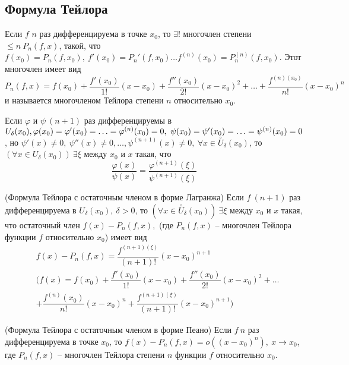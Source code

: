 \begin{multicols}{2}
    \subsection*{Формула Тейлора}
    \begin{lemma}{}{}
        Если $f$ $n$ раз дифференцируема в точке $x_0$, то $\exists !$ многочлен степени $\leq n\ P_n(f,x)$, такой, что $f(x_0) = P_n(f,x_0),\ f'(x_0) = P_n'(f,x_0)\ldots f^{(n)} (x_0) = P^{(n)}_n(f,x_0)$. Этот многочлен имеет вид \[
            P_n(f,x) = f(x_0) + \dfrac{f'(x_0)}{1!}(x-x_0) + \dfrac{f''(x_0)}{2!}(x-x_0)^2 + \ldots + \dfrac{f^{(n)(x_0)}}{n!} (x-x_0)^n
        \] и называется многочленом Тейлора степени $n$ относительно $x_0$.
    \end{lemma}
    \begin{lemma}{}{}
        Если $\varphi $ и $\psi\ (n+1)$ раз дифференцируемы в $U_\delta(x_0),\\ \varphi(x_0) = \varphi'(x_0) = \ldots = \varphi^{(n)}(x_0) = 0,\ \psi(x_0) = \psi'(x_0) = \ldots = \psi^{(n)} (x_0) = 0$, но $\psi'(x) \neq 0, \ \psi''(x) \neq 0, \ldots, \psi^{(n+1)}(x) \neq 0,\ \forall x \in \overset{\circ}{U}_\delta(x_0)$, то $(\forall x \in U_\delta (x_0))\ \exists \xi$ между $x_0$ и $x$  такая, что \[
            \dfrac{\varphi(x)}{\psi(x)} = \dfrac{\varphi^{(n+1)}(\xi)}{\psi^{(n+1)}(\xi)}
        \]
    \end{lemma}
    \begin{theorema}{(Формула Тейлора с остаточным членом в форме Лагранжа)}{}
         Если $f\ (n+1)$ раз дифференцируема в $U_\delta(x_0),\ \delta > 0$, то $(\forall x \in \overset{\circ}{U}_\delta (x_0))\ \exists \xi$ между $x_0$ и $x$ такая, что остаточный член $f(x) - P_n(f,x), $ (где $P_n(f,x)$ -- многочлен Тейлора функции $f$ относительно $x_0$) имеет вид \begin{align*}
            &f(x) - P_n(f,x) = \dfrac{f^{(n+1)(\xi)}}{(n+1)!}(x-x_0)^{n+1}\\&(f(x) = f(x_0) + \dfrac{f'(x_0)}{1!}(x-x_0)+\dfrac{f''(x_0)}{2!}(x-x_0)^2 + \ldots \\& + \dfrac{f^{(n)}(x_0)}{n!}(x-x_0)^n + \dfrac{f^{(n+1)(\xi)}}{(n+1)!}(x-x_0)^{n+1})
    \end{align*}
    \end{theorema}
    \begin{theorema}{(Формула Тейлора с остаточным членом в форме Пеано)}{}
         Если $f\ n$ раз дифференцируема в точке $x_0$, то $f(x) - P_n(f,x) = o((x-x_0)^n),\ x\to x_0$, где $P_n(f,x)$ -- многочлен Тейлора степени $n$ функции $f$ относительно $x_0$.

\end{theorema}
\end{multicols}
